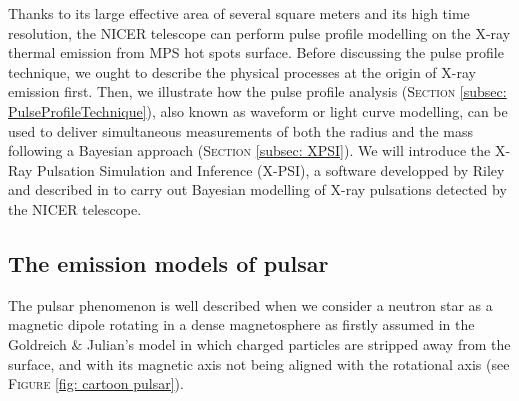 \documentclass[a4paper, twoside, 12pt]{article}
\numberwithin{equation}{section}
\begin{document}
{Thanks to its large effective area of several square meters and its high time resolution, the NICER telescope can perform pulse profile modelling on the X-ray thermal emission from MPS hot spots surface. Before discussing the pulse profile technique, we ought to describe  the physical processes at the origin of X-ray emission first. Then, we illustrate how the pulse profile analysis (S\textsc{ection} \ref{subsec: PulseProfileTechnique}), also known as waveform or light curve modelling, can be used to deliver simultaneous measurements of both the radius and the mass following a Bayesian approach (S\textsc{ection} \ref{subsec: XPSI}}). We will introduce the X-Ray Pulsation Simulation and Inference (X-PSI), a software developped by Riley and described in \cite{Riley+19} to carry out Bayesian modelling of X-ray pulsations detected by the NICER telescope. 



\subsection{The emission models of pulsar }
\label{subsec: EmissionModels}

\hspace{\parindent}	The pulsar phenomenon is well described when we consider a neutron star as a magnetic dipole rotating in a dense magnetosphere as firstly assumed in the Goldreich $\&$ Julian's model \cite{PulsarModels} in which charged particles are stripped away from the surface, and with its magnetic axis not being aligned with the rotational axis (see F\textsc{igure} \ref{fig: cartoon pulsar}). \\
\end{document}
